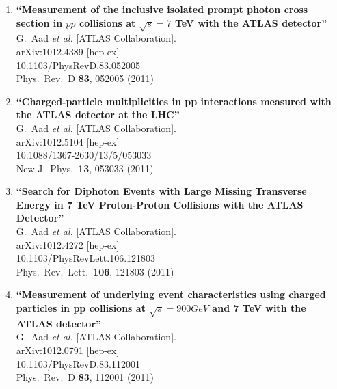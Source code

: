 \documentclass{article}
\begin{document}
\begin{enumerate}
\item%
{\bf ``Measurement of the inclusive isolated prompt photon cross section in $pp$ collisions at $\sqrt{s}=7$ TeV with the ATLAS detector''}
  \\{}G.~Aad {\it et al.}  [ATLAS Collaboration].
  \\{}arXiv:1012.4389 [hep-ex]
    \\{}10.1103/PhysRevD.83.052005
\\{}Phys.\ Rev.\ D {\bf 83}, 052005 (2011) %


\item%
{\bf ``Charged-particle multiplicities in pp interactions measured with the ATLAS detector at the LHC''}
  \\{}G.~Aad {\it et al.}  [ATLAS Collaboration].
  \\{}arXiv:1012.5104 [hep-ex]
    \\{}10.1088/1367-2630/13/5/053033
\\{}New J.\ Phys.\  {\bf 13}, 053033 (2011) %


\item%
{\bf ``Search for Diphoton Events with Large Missing Transverse Energy in 7 TeV Proton-Proton Collisions with the ATLAS Detector''}
  \\{}G.~Aad {\it et al.}  [ATLAS Collaboration].
  \\{}arXiv:1012.4272 [hep-ex]
    \\{}10.1103/PhysRevLett.106.121803
\\{}Phys.\ Rev.\ Lett.\  {\bf 106}, 121803 (2011) %


\item%
{\bf ``Measurement of underlying event characteristics using charged particles in pp collisions at $\sqrt{s} = 900 GeV$ and 7 TeV with the ATLAS detector''}
  \\{}G.~Aad {\it et al.}  [ATLAS Collaboration].
  \\{}arXiv:1012.0791 [hep-ex]
    \\{}10.1103/PhysRevD.83.112001
\\{}Phys.\ Rev.\ D {\bf 83}, 112001 (2011) %



\end{enumerate}
\end{document}
